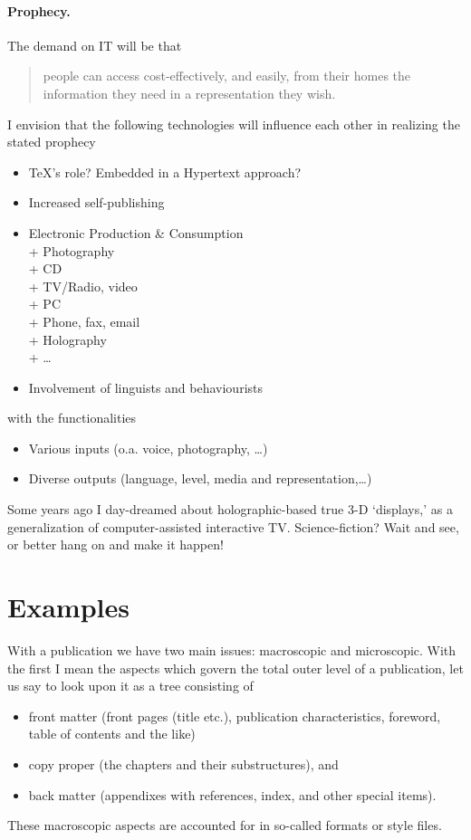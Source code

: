 \paragraph*{Prophecy.}
The demand on IT will be that
\begin{quote}
people can access cost-effectively, and easily,
from their homes  the information they need in a representation they wish.
\end{quote}
I envision that the following technologies will influence each other
in realizing the stated prophecy
\begin{itemize}
\item \TeX's role? Embedded in a Hypertext approach?
\item Increased self-publishing
\item Electronic Production \& Consumption \\
      + Photography\\
      + CD\\
      + TV/Radio, video\\
      + PC       \\
      + Phone, fax, email \\
      + Holography \\
      + \ldots
\item Involvement of linguists and behaviourists
\end{itemize}
\noindent with the functionalities
\begin{itemize}
\item Various inputs (o.a. voice, photography, \ldots)
\item Diverse outputs
(language, level, media and representation,\ldots)
\end{itemize}
Some years ago I day-dreamed about holographic-based true 3-D `displays,'
as a generalization of computer-assisted interactive TV.
Science-fiction? Wait and see, or better hang on and make it happen!

\section{Examples}
With a publication we have two main issues:  macroscopic and microscopic.
With the first I mean the aspects which govern the total outer level of
a publication, let us say to look upon it as a tree consisting of
\begin{itemize}
\item front matter (front pages (title etc.), publication characteristics,
                    foreword, table of contents and the like)
\item copy proper  (the chapters and their substructures),
      and
\item back matter  (appendixes with references,  index, and other special
                   items).
\end{itemize}
\noindent These macroscopic aspects are accounted for in so-called formats or
style files.

